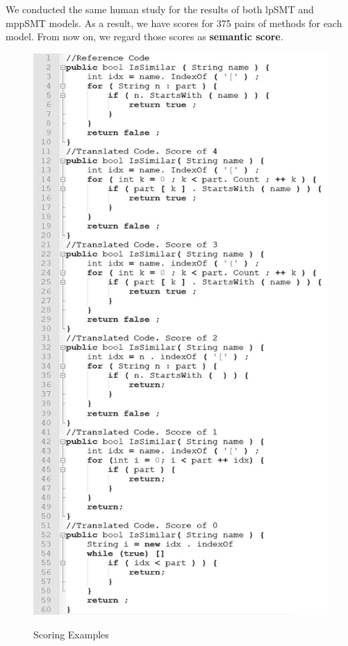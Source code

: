 
We conducted the same human study for the results of both lpSMT and mppSMT models. As a result, we have scores for 375 pairs of methods for each model. From now on, we regard those scores as \textbf{semantic score}.

\begin{figure}
\caption{Scoring Examples}
\centering
\includegraphics{img/scoreExamples}
\label{fig:scoreEG}
\end{figure}



